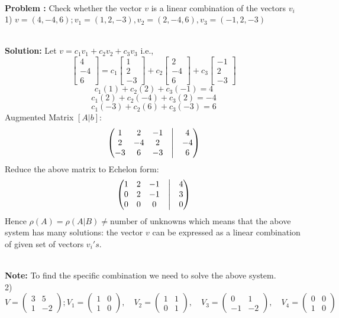 \documentclass[DIV=20,oneside]{scrartcl}
\newcounter{problem}
\newcommand{\problem}{
	\stepcounter{problem}
	\noindent\textbf{\\Problem \theproblem: }
}
\newcommand{\note}{
	\noindent\textbf{\\Note: }
}
\newcommand{\solution}{
	\noindent\textbf{\\Solution: }
}
\begin{document}
\problem Check whether the vector $v$ is a linear combination of the vectors $v_i$
\\
1) $v=(4, -4, 6); v_1=(1, 2, -3), v_2=(2, -4, 6), v_3=(-1, 2, -3)$
\solution Let $v=c_1 v_1+c_2 v_2+c_3 v_3$ i.e.,
$$\begin{bmatrix} 4 \\ -4 \\ 6 \end{bmatrix}=c_1 \begin{bmatrix} 1 \\ 2 \\ -3 \end{bmatrix}+c_2 \begin{bmatrix} 2 \\ -4 \\ 6 \end{bmatrix} +c_3 \begin{bmatrix} -1 \\ 2 \\ -3 \end{bmatrix}$$
$$c_1(1) + c_2(2) + c_3(-1) = 4$$$$c_1(2) + c_2(-4) + c_3(2) = -4$$$$c_1(-3) + c_2(6) + c_3(-3) = 6$$
Augmented Matrix  $[A | b]$:
$$\begin{pmatrix} 
	1 & 2 & -1 & \bigm| & 4 \\ 
	2 & -4 & 2 & \bigm| & -4 \\ 
	-3 & 6 & -3 & \bigm| & 6 
\end{pmatrix}$$
Reduce the above matrix to Echelon form:
$$\begin{pmatrix} 
	1 & 2 & -1 & \bigm| & 4 \\ 
	0 & 2 & -1 & \bigm| & 3 \\ 
	0 & 0 & 0 & \bigm| & 0 
\end{pmatrix}$$
Hence $\rho(A)=\rho(A|B)\neq \text{number of unknowns}$ which means that the above system has many solutions: the vector $v$ can be expressed as a linear combination of given set of vectors $v_i's$.
\note To find the specific combination we need to solve the above system.
\\
2) $V = \begin{pmatrix} 3 & 5 \\ 1 & -2 \end{pmatrix}; V_1 = \begin{pmatrix} 1 & 0 \\ 1 & 0 \end{pmatrix}, \quad V_2 = \begin{pmatrix} 1 & 1 \\ 0 & 1 \end{pmatrix}, \quad V_3 = \begin{pmatrix} 0 & 1 \\ -1 & -2 \end{pmatrix}, \quad V_4 = \begin{pmatrix} 0 & 0 \\ 1 & 0 \end{pmatrix}$
\end{document}

